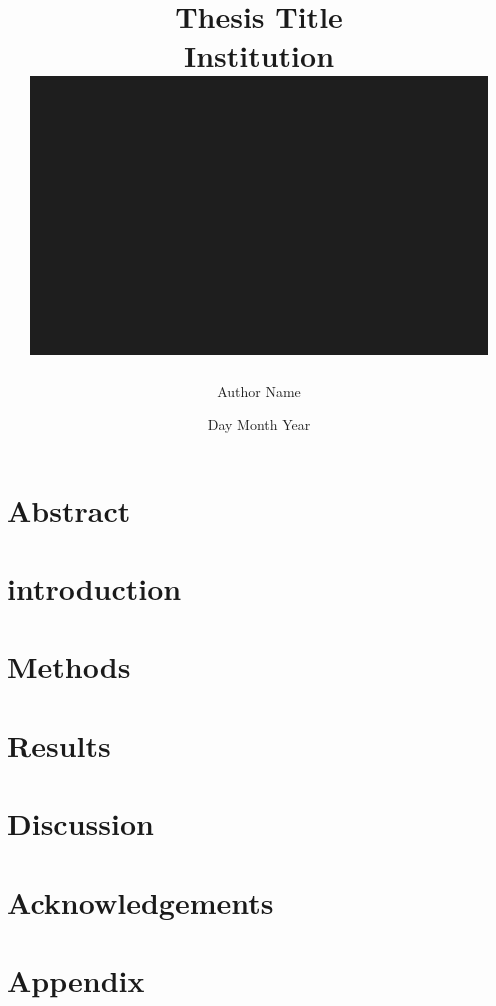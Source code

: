\documentclass[12pt, a4paper, twoside]{report}
\title{
    {Thesis Title}\\
    {\large Institution}\\ 
    {\includegraphics{img.png}}
}
\author{Author Name}
\date{Day Month Year}
\begin{document}
 

 
\chapter*{Abstract}

 
\tableofcontents

\listoffigures

\listoftables


\chapter{introduction}


\chapter{Methods}


\chapter{Results}


\chapter{Discussion}


\chapter{Acknowledgements}


\appendix
\chapter{Appendix}


\printbibliography
\end{document}
